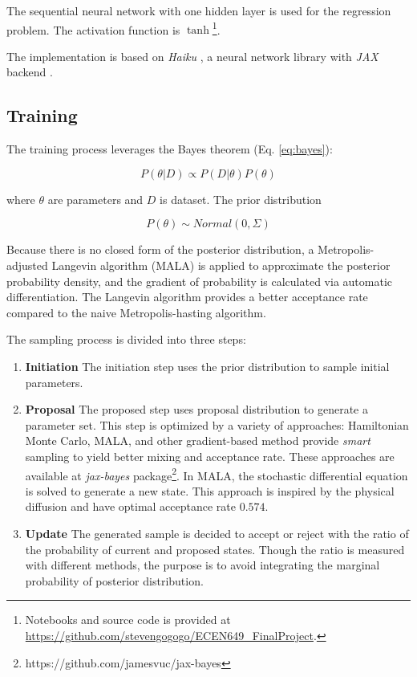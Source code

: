 \documentclass{article}
\begin{document}
The sequential neural network with one hidden layer is used for the regression problem. The activation function is $\tanh$\footnote{Notebooks and source code is provided at \url{https://github.com/stevengogogo/ECEN649_FinalProject}.}.

The implementation is based on \textit{Haiku} \cite{haiku2020github}, a neural network library with \textit{JAX} backend \cite{jax2018github}.




\subsection{Training}

The training process leverages the Bayes theorem (Eq. \ref{eq:bayes}):

\begin{equation}
P(\theta | D) \propto P(D|\theta) P(\theta)
\label{eq:bayes}
\end{equation}

where $\theta$ are parameters and $D$ is dataset. The prior distribution 

\begin{equation}
P(\theta) \sim Normal(0, \Sigma)
\end{equation}


Because there is no closed form of the posterior distribution, a Metropolis-adjusted Langevin algorithm (MALA) is applied to approximate the posterior probability density, and the gradient of probability is calculated via automatic differentiation. The Langevin algorithm provides a better acceptance rate compared to the naive Metropolis-hasting algorithm\cite{roberts1998optimal}. 

The sampling process is divided into three steps:

\begin{enumerate}
    \item \textbf{Initiation} The initiation step uses the prior distribution to sample initial parameters.
    \item \textbf{Proposal} The proposed step uses proposal distribution to generate a  parameter set. This step is optimized by a variety of approaches\cite{jospin2022a}: Hamiltonian Monte Carlo\cite{neal1996, neal2011}, MALA, and other gradient-based method provide \textit{smart} sampling to yield better mixing and acceptance rate. These approaches are available at \textit{jax-bayes} package\footnote{https://github.com/jamesvuc/jax-bayes}. In MALA, the stochastic differential equation is solved to generate a new state. This approach is inspired by the physical diffusion and have optimal acceptance rate $0.574$\cite{roberts1998optimal}.
    \item \textbf{Update} The generated sample is decided to accept or reject with the ratio of the probability of current and proposed states. Though the ratio is measured with different methods, the purpose is to avoid integrating the marginal probability of posterior distribution.
\end{enumerate}
\end{document}

